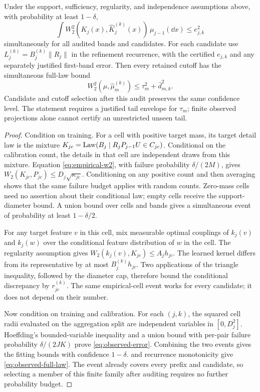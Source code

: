 \begin{theorem}\label{thm:observed-audit}
Under the support, sufficiency, regularity, and independence assumptions above, with probability at least $1-\delta$,
\[
 \int W_2^2(K_j(x),\widehat K_j^{(k)}(x))\,\mu_{j-1}(\dd x)
 \le e_{j,k}^2
\]
simultaneously for all audited bands and candidates. For each candidate use
$L_j^{(k)}=B_j^{(k)}\|R_j\|$ in the refinement recurrence, with the certified $e_{j,k}$ and any separately justified first-band error. Then every retained cutoff has the simultaneous full-law bound
\begin{equation}\label{eq:observed-full-law}
 W_2^2(\mu,\widehat\mu_m^{(k)})\le\tau_m^2+\bar d_{m,k}^2.
\end{equation}
Candidate and cutoff selection after this audit preserves the same confidence level. The statement requires a justified tail envelope for $\tau_m$; finite observed projections alone cannot certify an unrestricted unseen tail.
\end{theorem}
\begin{proof}
Condition on training. For a cell with positive target mass, its target detail law is the mixture $K_{jc}=\operatorname{Law}(B_j\mid R_jP_{j-1}U\in C_{jc})$. Conditional on the calibration count, the details in that cell are independent draws from this mixture. Equation \eqref{eq:empirical-w2}, with failure probability $\delta/(2M)$, gives
$W_2(K_{jc},P_{jc})\le D_j\sqrt{\kappa_{jc}}$.
Conditioning on any positive count and then averaging shows that the same failure budget applies with random counts. Zero-mass cells need no assertion about their conditional law; empty cells receive the support-diameter bound. A union bound over cells and bands gives a simultaneous event of probability at least $1-\delta/2$.

For any target feature $v$ in this cell, mix measurable optimal couplings of $k_j(v)$ and $k_j(w)$ over the conditional feature distribution of $w$ in the cell. The regularity assumption gives
$W_2(k_j(v),K_{jc})\le A_jh_{jc}$.
The learned kernel differs from its representative by at most $B_j^{(k)}h_{jc}$. Two applications of the triangle inequality, followed by the diameter cap, therefore bound the conditional discrepancy by $r_{jc}^{(k)}$. The same empirical-cell event works for every candidate; it does not depend on their number.

Now condition on training and calibration. For each $(j,k)$, the squared cell radii evaluated on the aggregation split are independent variables in $[0,D_j^2]$. Hoeffding's bounded-variable inequality \citep{hoeffding1963} and a union bound with per-pair failure probability $\delta/(2JK)$ prove \eqref{eq:observed-error}. Combining the two events gives the fitting bounds with confidence $1-\delta$.  and recurrence monotonicity give \eqref{eq:observed-full-law}. The event already covers every prefix and candidate, so selecting a member of this finite family after auditing requires no further probability budget.
\end{proof}

